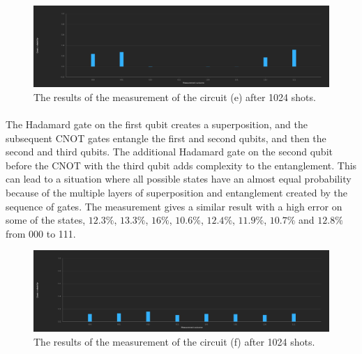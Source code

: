 \documentclass[12pt]{article}
\begin{document}
\begin{figure}[H]
    \centering
    \includegraphics[scale=0.27]{e.png}
    \caption{The results of the measurement of the circuit (e) after 1024 shots.}
\end{figure}

\paragraph*{}

The Hadamard gate on the first qubit creates a superposition, and the subsequent CNOT gates entangle the first and second qubits, and then the second and third qubits. The additional Hadamard gate on the second qubit before the CNOT with the third qubit adds complexity to the entanglement. This can lead to a situation where all possible states have an almost equal probability because of the multiple layers of superposition and entanglement created by the sequence of gates. The measurement gives a similar result with a high error on some of the states, $12.3\%$, $13.3\%$, $16\%$, $10.6\%$, $12.4\%$, $11.9\%$, $10.7\%$ and $12.8\%$ from 000 to 111.

\begin{figure}[H]
    \centering
    \includegraphics[scale=0.27]{f.png}
    \caption{The results of the measurement of the circuit (f) after 1024 shots.}
\end{figure}
\end{document}
